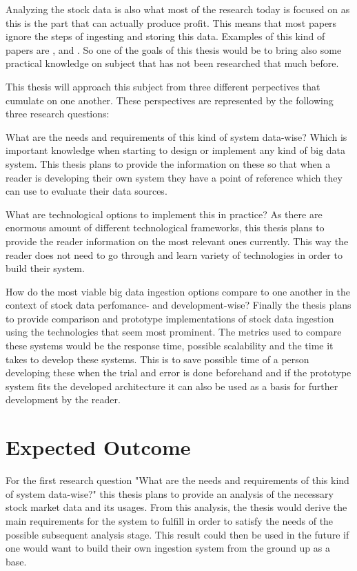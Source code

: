 \documentclass[article,11pt]{article}
\begin{document}
Analyzing the stock data is also what most of the research today is focused on as this is the part that can actually produce profit.
This means that most papers ignore the steps of ingesting and storing this data.
Examples of this kind of papers are \cite{wu}, \cite{aghakhani} and \cite{kao}.
So one of the goals of this thesis would be to bring also some practical knowledge on subject that has not been researched that much before. 

This thesis will approach this subject from three different perpectives that cumulate on one another.
These perspectives are represented by the following three research questions:

What are the needs and requirements of this kind of system data-wise?
Which is important knowledge when starting to design or implement any kind of big data system.
This thesis plans to provide the information on these so that when a reader is developing their own system they have a point of reference which they can use to evaluate their data sources.

What are technological options to implement this in practice?
As there are enormous amount of different technological frameworks, this thesis plans to provide the reader information on the most relevant ones currently.
This way the reader does not need to go through and learn variety of technologies in order to build their system.

How do the most viable big data ingestion options compare to one another in the context of stock data perfomance- and development-wise?
Finally the thesis plans to provide comparison and prototype implementations of stock data ingestion using the technologies that seem most prominent.
The metrics used to compare these systems would be the response time, possible scalability and the time it takes to develop these systems.
This is to save possible time of a person developing these when the trial and error is done beforehand and if the prototype system fits the developed architecture it can also be used as a basis for further development by the reader.

\section{Expected Outcome}

For the first research question "What are the needs and requirements of this kind of system data-wise?" this thesis plans to provide an analysis of the necessary stock market data and its usages.
From this analysis, the thesis would derive the main requirements for the system to fulfill in order to satisfy the needs of the possible subsequent analysis stage.
This result could then be used in the future if one would want to build their own ingestion system from the ground up as a base.
\end{document}
